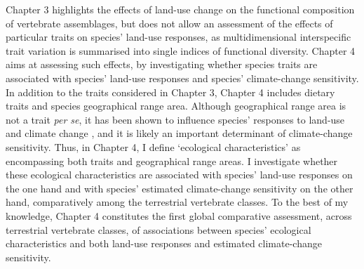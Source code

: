 Chapter 3 highlights the effects of land-use change on the functional composition of vertebrate assemblages, but does not allow an assessment of the effects of particular traits on species' land-use responses, as multidimensional interspecific trait variation is summarised into single indices of functional diversity. Chapter 4 aims at assessing such effects, by investigating whether species traits are associated with species' land-use responses and species' climate-change sensitivity. In addition to the traits considered in Chapter 3, Chapter 4 includes dietary traits and species geographical range area. Although geographical range area is not a trait \textit{per se}, it has been shown to influence species' responses to land-use and climate change \citep{Thuiller2005, Newbold2018a}, and it is likely an important determinant of climate-change sensitivity. Thus, in Chapter 4, I define `ecological characteristics' as encompassing both traits and geographical range areas. I investigate whether these ecological characteristics are associated with species' land-use responses on the one hand and with species' estimated climate-change sensitivity on the other hand, comparatively among the terrestrial vertebrate classes. To the best of my knowledge, Chapter 4 constitutes the first global comparative assessment, across terrestrial  vertebrate classes, of associations between species' ecological characteristics and both land-use responses and estimated climate-change sensitivity.

